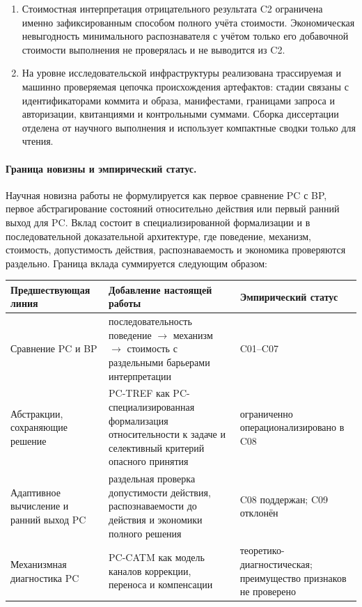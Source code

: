 \begin{enumerate}
  \item Стоимостная интерпретация отрицательного результата C2 ограничена именно
  зафиксированным способом полного учёта стоимости. Экономическая невыгодность
  минимального распознавателя с учётом только его добавочной стоимости выполнения
  не проверялась и не выводится из C2.

  \item На уровне исследовательской инфраструктуры реализована трассируемая и
  машинно проверяемая цепочка происхождения артефактов: стадии связаны с
  идентификаторами коммита и образа, манифестами, границами запроса и
  авторизации, квитанциями и контрольными суммами. Сборка диссертации отделена
  от научного выполнения и использует компактные сводки только для чтения.
\end{enumerate}

\paragraph{Граница новизны и эмпирический статус.}
Научная новизна работы не формулируется как первое сравнение PC с BP, первое
абстрагирование состояний относительно действия или первый ранний выход для PC.
Вклад состоит в специализированной формализации и в последовательной
доказательной архитектуре, где поведение, механизм, стоимость, допустимость
действия, распознаваемость и экономика проверяются раздельно. Граница вклада
суммируется следующим образом:
\begin{center}
\small
\begin{tabular}{p{}p{}p{}}
\toprule
Предшествующая линия & Добавление настоящей работы & Эмпирический статус \\
\midrule
Сравнение PC и BP & последовательность поведение $\to$ механизм $\to$ стоимость с раздельными барьерами интерпретации & C01--C07 \\
Абстракции, сохраняющие решение & PC-TREF как PC-специализированная формализация относительности к задаче и селективный критерий опасного принятия & ограниченно операционализировано в C08 \\
Адаптивное вычисление и ранний выход PC & раздельная проверка допустимости действия, распознаваемости до действия и экономики полного решения & C08 поддержан; C09 отклонён \\
Механизмная диагностика PC & PC-CATM как модель каналов коррекции, переноса и компенсации & теоретико-диагностическая; преимущество признаков не проверено \\
\bottomrule
\end{tabular}
\end{center}

